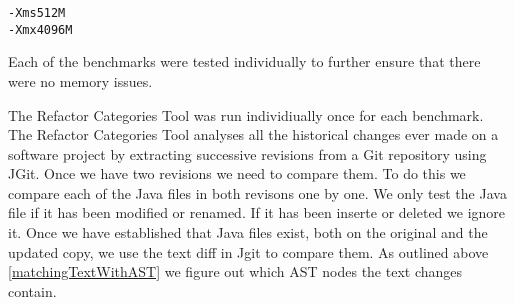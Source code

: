 \begin{verbatim}
-Xms512M 
-Xmx4096M
\end{verbatim}

Each of the benchmarks were tested individually to further ensure that there were no memory issues.

The Refactor Categories Tool was run individiually once for each benchmark.  The Refactor Categories Tool analyses all the historical changes ever made on a software project by extracting successive revisions from a Git repository using JGit.  Once we have two revisions we need to compare them.  To do this we compare each of the Java files in both revisons one by one. We only test the Java file if it has been modified or renamed.  If it has been inserte or deleted we ignore it. Once we have established that Java files exist, both on the original and the updated copy, we use the text diff in Jgit to compare them. As outlined above \ref{matchingTextWithAST} we figure out which AST nodes the text changes contain.   



